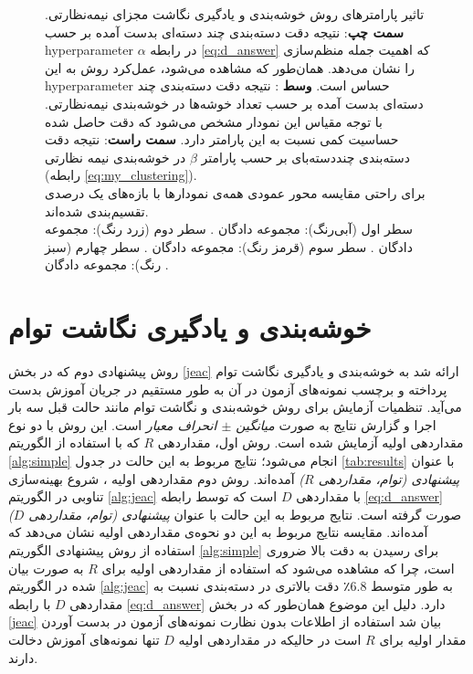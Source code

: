 \begin{figure}[!h]
\begin{subfigure}[b]{0.3\linewidth}
  \end{subfigure}
  \caption[تحلیل پارامترهای روش دسته‌بندی با خوشه‌بندی نیمه‌نظارتی]{
  تاثیر پارامترهای  روش خوشه‌بندی و یادگیری نگاشت مجزای نیمه‌نظارتی.    \textbf{سمت چپ}: نتیجه دقت دسته‌بندی چند دسته‌ای بدست آمده بر حسب \gls{hyperparameter}  $\alpha$ در رابطه
 \eqref{eq:d_answer}
 که اهمیت جمله منظم‌سازی را نشان می‌دهد. همان‌طور که مشاهده می‌شود، عمل‌کرد روش به این \gls{hyperparameter} حساس است.
 \textbf{وسط }:
 نتیجه دقت  دسته‌بندی چند دسته‌ای بدست آمده بر حسب تعداد خوشه‌ها در خوشه‌بندی نیمه‌نظارتی. با توجه مقیاس این نمودار مشخص می‌شود که دقت حاصل شده حساسیت کمی نسبت به این پارامتر دارد.
  \textbf{سمت راست}:
  نتیجه دقت دسته‌بندی چنددسته‌بای بر حسب پارامتر $\beta$ در خوشه‌بندی نیمه نظارتی (رابطه \eqref{eq:my_clustering}).\\
  برای راحتی مقایسه محور عمودی  همه‌ی نمودارها با بازه‌های یک درصدی تقسیم‌بندی شده‌اند.\\
سطر اول (آبی‌رنگ): مجموعه دادگان . سطر دوم (زرد رنگ): مجموعه دادگان . سطر سوم (قرمز رنگ): مجموعه دادگان . سطر چهارم (سبز رنگ): مجموعه دادگان .
 }
  \label{fig:simple_params}
  \end{figure}




\section{ خوشه‌بندی و یادگیری نگاشت توام}\label{exp:jeac}
\label{exp:cluster}
روش پیشنهادی دوم که در بخش \ref{jeac} ارائه شد به خوشه‌بندی و یادگیری نگاشت توام پرداخته و برچسب نمونه‌های آزمون در آن به طور مستقیم در جریان آموزش بدست می‌آید.
تنظمیات آزمایش برای روش خوشه‌بندی و نگاشت توام مانند حالت قبل سه بار اجرا و گزارش نتایج به صورت \textit{ میانگین $\pm$ انحراف معیار } است. این روش با دو نوع  مقداردهی اولیه آزمایش شده است. روش اول، مقداردهی $R$ که با استفاده از الگوریتم
\ref{alg:simple}
انجام می‌شود؛ نتایج مربوط به این حالت در جدول  \ref{tab:results} با عنوان
\textit{ پیشنهادی (توام، مقداردهی $R$)}
آمده‌اند. روش دوم مقداردهی اولیه ، شروع بهینه‌سازی تناوبی در الگوریتم
\ref{alg:jeac}
 با مقداردهی $D$ است که توسط رابطه
\eqref{eq:d_answer}
صورت گرفته است. نتایج مربوط به این حالت با عنوان
\textit{پیشنهادی (توام، مقداردهی $D$)}
آمده‌اند. مقایسه نتایج مربوط به این دو نحوه‌ی مقداردهی اولیه نشان می‌دهد که استفاده از روش پیشنهادی الگوریتم \ref{alg:simple}  برای رسیدن به دقت بالا ضروری است، چرا که مشاهده می‌شود که استفاده از مقداردهی اولیه برای $R$ به صورت بیان شده در الگوریتم \ref{alg:jeac} به طور متوسط $6.8$٪ دقت بالاتری در دسته‌بندی نسبت به مقداردهی $D$  با رابطه \eqref{eq:d_answer} دارد. دلیل این موضوع همان‌طور که در بخش \ref{jeac} بیان شد استفاده از اطلاعات بدون نظارت نمونه‌های آزمون در بدست آوردن مقدار اولیه برای $R$ است در حالیکه در مقداردهی اولیه $D$ تنها نمونه‌های آموزش دخالت دارند.

